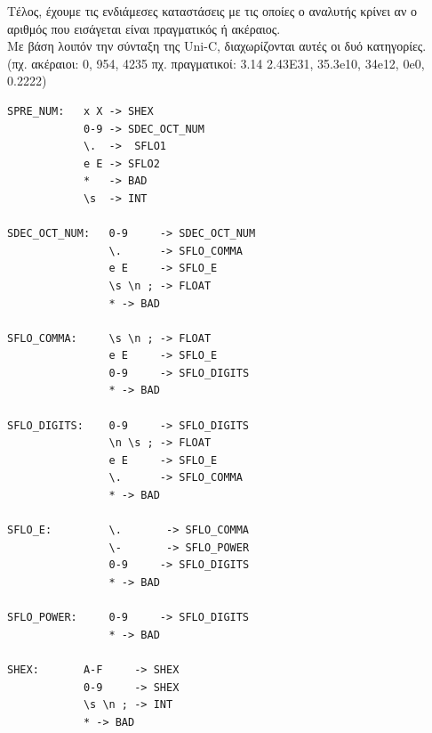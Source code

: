 \documentclass[14pt]{extarticle}
\begin{document}
\clearpage
Τέλος, έχουμε τις ενδιάμεσες καταστάσεις με τις οποίες ο αναλυτής κρίνει αν ο αριθμός που εισάγεται είναι πραγματικός ή ακέραιος.
\\
Με βάση λοιπόν την σύνταξη της \textlatin{Uni-C}, διαχωρίζονται αυτές οι δυό κατηγορίες.
\\
(πχ. ακέραιοι: 0, 954, 4235 πχ. πραγματικοί: 3.14 2.43Ε31, 35.3\textlatin{e}10, 34\textlatin{e}12, 0\textlatin{e}0, 0.2222)  
    \begin{lstlisting}
SPRE_NUM:   x X -> SHEX
            0-9 -> SDEC_OCT_NUM
            \.  ->  SFLO1
            e E -> SFLO2
            *   -> BAD
            \s  -> INT
            
SDEC_OCT_NUM:   0-9     -> SDEC_OCT_NUM
                \.      -> SFLO_COMMA
                e E     -> SFLO_E
                \s \n ; -> FLOAT
                * -> BAD

SFLO_COMMA:     \s \n ; -> FLOAT
                e E     -> SFLO_E
                0-9     -> SFLO_DIGITS
                * -> BAD

SFLO_DIGITS:    0-9     -> SFLO_DIGITS
                \n \s ; -> FLOAT
                e E     -> SFLO_E
                \.      -> SFLO_COMMA
                * -> BAD

SFLO_E:         \.       -> SFLO_COMMA
                \-       -> SFLO_POWER 
                0-9     -> SFLO_DIGITS
                * -> BAD

SFLO_POWER:     0-9     -> SFLO_DIGITS
                * -> BAD
    
SHEX:       A-F     -> SHEX
            0-9     -> SHEX
            \s \n ; -> INT
            * -> BAD
    \end{lstlisting}


\clearpage
\end{document}

